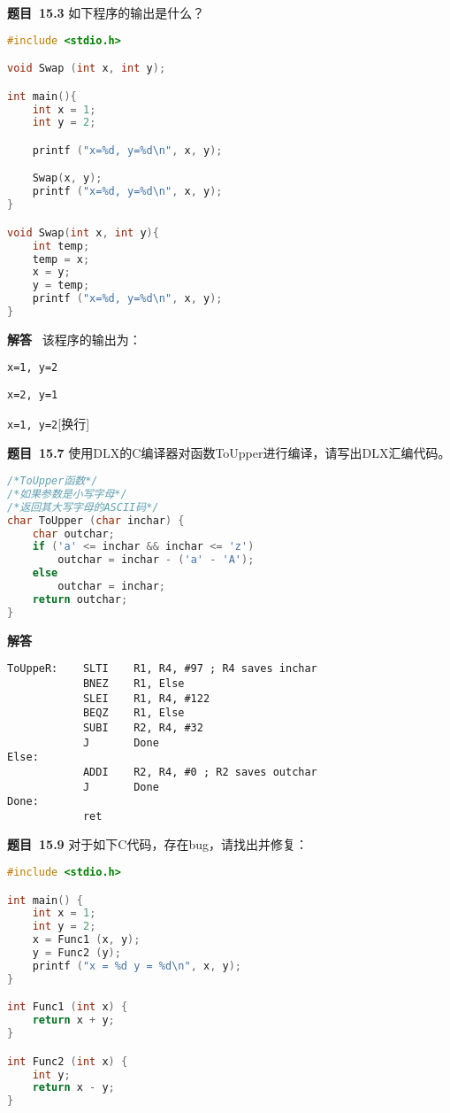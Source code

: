 \documentclass[10pt,a4paper,UTF8]{ctexart}
\newcommand{\problemname}{待定义}
\newenvironment{problem}{\begin{shaded}\par\noindent\textbf{题目\  \problemname}}{\end{shaded}\par}
\newenvironment{solution}{\par\noindent\textbf{解答}\ }{\par}
\begin{document}
\renewcommand{\problemname}{15.3}
\begin{problem}
	如下程序的输出是什么？
	\begin{lstlisting}[language=C]
#include <stdio.h>

void Swap (int x, int y);

int main(){
	int x = 1;
	int y = 2;

	printf ("x=%d, y=%d\n", x, y);

	Swap(x, y);
	printf ("x=%d, y=%d\n", x, y);
}

void Swap(int x, int y){
	int temp;
	temp = x;
	x = y;
	y = temp;
	printf ("x=%d, y=%d\n", x, y);
}
	\end{lstlisting}
\end{problem}

\begin{solution}
	该程序的输出为：

	\verb|x=1, y=2|

	\verb|x=2, y=1|

	\verb|x=1, y=2|[换行]
\end{solution}


\renewcommand{\problemname}{15.7}
\begin{problem}
	使用DLX的C编译器对函数ToUpper进行编译，请写出DLX汇编代码。
	\begin{lstlisting}[language=C]
/*ToUpper函数*/
/*如果参数是小写字母*/
/*返回其大写字母的ASCII码*/ 
char ToUpper (char inchar) { 
	char outchar; 
	if ('a' <= inchar && inchar <= 'z') 
		outchar = inchar - ('a' - 'A'); 
	else 
		outchar = inchar; 
	return outchar; 
} 
	\end{lstlisting}
\end{problem}

\begin{solution}
	\begin{lstlisting}
ToUppeR:	SLTI 	R1, R4, #97 ; R4 saves inchar
			BNEZ 	R1, Else
			SLEI 	R1, R4, #122
			BEQZ 	R1, Else
			SUBI 	R2, R4, #32
			J 		Done
Else:
			ADDI 	R2, R4, #0 ; R2 saves outchar
			J 		Done
Done:
			ret
	\end{lstlisting}
\end{solution}


\renewcommand{\problemname}{15.9}
\begin{problem}
	对于如下C代码，存在bug，请找出并修复：
	\begin{lstlisting}[language=C]
#include <stdio.h>

int main() { 
	int x = 1; 
	int y = 2; 
	x = Func1 (x, y); 
	y = Func2 (y); 
	printf ("x = %d y = %d\n", x, y); 
} 

int Func1 (int x) { 
	return x + y; 
} 

int Func2 (int x) { 
	int y; 
	return x - y; 
} 
	\end{lstlisting}
\end{problem}
\end{document}
